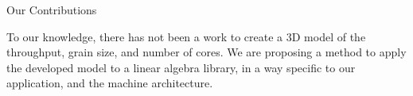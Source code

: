 \documentclass[10pt]{beamer}
\begin{document}
%			


\begin{frame}{Our Contributions}
	\begin{outline}
		\1To our knowledge, there has not been a work to create a 3D model of the throughput, grain size, and number of cores. 
		\1We are proposing a method to apply the developed model to a linear algebra library, in a way specific to our application, and the machine architecture.
	\end{outline}
\end{frame}
\end{document}
